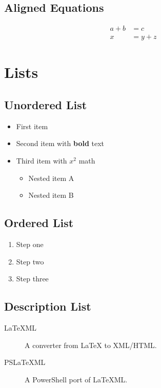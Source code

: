 \documentclass[12pt]{article}
\begin{document}
\subsection{Aligned Equations}

\begin{align}
  a + b &= c \\
  x     &= y + z
\end{align}

\section{Lists}

\subsection{Unordered List}

\begin{itemize}
  \item First item
  \item Second item with \textbf{bold} text
  \item Third item with $x^2$ math
  \begin{itemize}
    \item Nested item A
    \item Nested item B
  \end{itemize}
\end{itemize}

\subsection{Ordered List}

\begin{enumerate}
  \item Step one
  \item Step two
  \item Step three
\end{enumerate}

\subsection{Description List}

\begin{description}
  \item[LaTeXML] A converter from \LaTeX{} to XML/HTML.
  \item[PSLaTeXML] A PowerShell port of LaTeXML.
\end{description}
\end{document}
